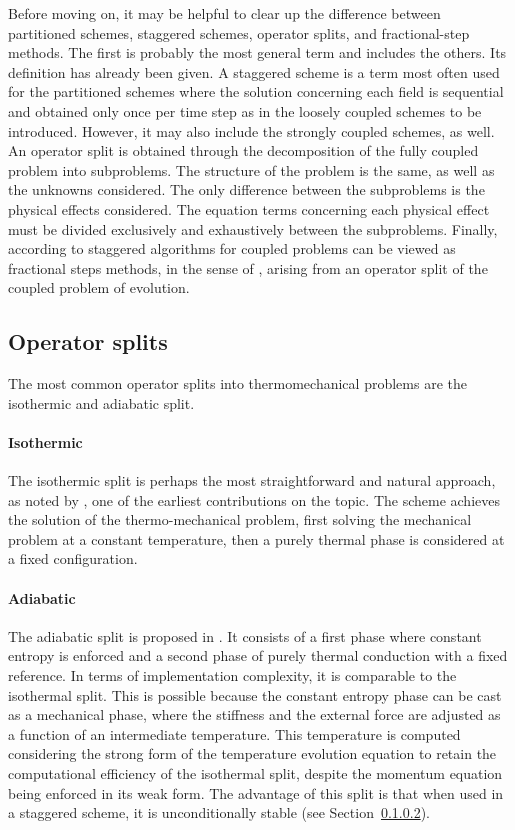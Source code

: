 Before moving on, it may be helpful to clear up the difference between partitioned schemes, staggered schemes, operator splits, and fractional-step methods.
The first is probably the most general term and includes the others.
Its definition has already been given.
A staggered scheme is a term most often used for the partitioned schemes where the solution concerning each field is sequential and obtained only once per time step as in the loosely coupled schemes to be introduced.
However, it may also include the strongly coupled schemes, as well.
An operator split is obtained through the decomposition of the fully coupled problem into subproblems.
The structure of the problem is the same, as well as the unknowns considered.
The only difference between the subproblems is the physical effects considered.
The equation terms concerning each physical effect must be divided exclusively and exhaustively between the subproblems.
Finally, according to \cite{armero_new_1992} staggered algorithms for coupled problems can be viewed as fractional steps methods, in the sense of \cite{holt_method_2012}, arising from an operator split of the coupled problem of evolution.

\subsection{Operator splits}

The most common operator splits into thermomechanical problems are the isothermic and adiabatic split.

\paragraph{Isothermic}

The isothermic split is perhaps the most straightforward and natural approach, as noted by \cite{argyris_natural_1981}, one of the earliest contributions on the topic.
The scheme achieves the solution of the thermo-mechanical problem, first solving the mechanical problem at a constant temperature, then a purely thermal phase is considered at a fixed configuration.

\paragraph{Adiabatic}

The adiabatic split is proposed in \cite{armero_new_1992}.
It consists of a first phase where constant entropy is enforced and a second phase of purely thermal conduction with a fixed reference.
In terms of implementation complexity, it is comparable to the isothermal split.
This is possible because the constant entropy phase can be cast as a mechanical phase, where the stiffness and the external force are adjusted as a function of an intermediate temperature.
This temperature is computed considering the strong form of the temperature evolution equation to retain the computational efficiency of the isothermal split, despite the momentum equation being enforced in its weak form.
The advantage of this split is that when used in a staggered scheme, it is unconditionally stable (see Section~\ref{}).



